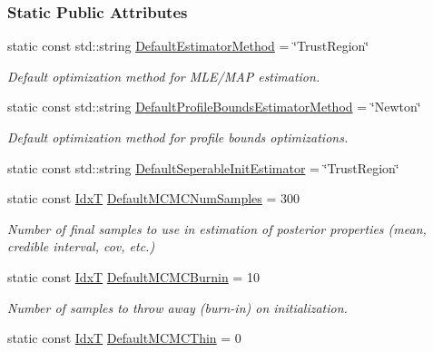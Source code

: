 \subsubsection*{Static Public Attributes}
\begin{DoxyCompactItemize}
\item 
static const std\+::string \hyperlink{classmappel_1_1PointEmitterModel_aa90f02cfd2af6acf4d8ba3bbfbe906e5}{Default\+Estimator\+Method} = \char`\"{}Trust\+Region\char`\"{}
\begin{DoxyCompactList}\small\item\em Default optimization method for M\+L\+E/\+M\+AP estimation. \end{DoxyCompactList}\item 
static const std\+::string \hyperlink{classmappel_1_1PointEmitterModel_a5240568f2d7c7bad84e900d283b299dc}{Default\+Profile\+Bounds\+Estimator\+Method} = \char`\"{}Newton\char`\"{}
\begin{DoxyCompactList}\small\item\em Default optimization method for profile bounds optimizations. \end{DoxyCompactList}\item 
static const std\+::string \hyperlink{classmappel_1_1PointEmitterModel_ad8c3dc629d75d22f25855a5f1ba8729f}{Default\+Seperable\+Init\+Estimator} = \char`\"{}Trust\+Region\char`\"{}
\item 
static const \hyperlink{namespacemappel_ab17ec0f30b61ece292439d7ece81d3a8}{IdxT} \hyperlink{classmappel_1_1PointEmitterModel_a9bbed2f2e91f1e5f0f4f9389cd2de333}{Default\+M\+C\+M\+C\+Num\+Samples} = 300
\begin{DoxyCompactList}\small\item\em Number of final samples to use in estimation of posterior properties (mean, credible interval, cov, etc.) \end{DoxyCompactList}\item 
static const \hyperlink{namespacemappel_ab17ec0f30b61ece292439d7ece81d3a8}{IdxT} \hyperlink{classmappel_1_1PointEmitterModel_a6fc96e398771a33d5586c2af10a2e6d8}{Default\+M\+C\+M\+C\+Burnin} = 10
\begin{DoxyCompactList}\small\item\em Number of samples to throw away (burn-\/in) on initialization. \end{DoxyCompactList}\item 
static const \hyperlink{namespacemappel_ab17ec0f30b61ece292439d7ece81d3a8}{IdxT} \hyperlink{classmappel_1_1PointEmitterModel_aac243ab7c6862c3d9ce3af8ca8a17e6c}{Default\+M\+C\+M\+C\+Thin} = 0

\end{DoxyCompactItemize}
